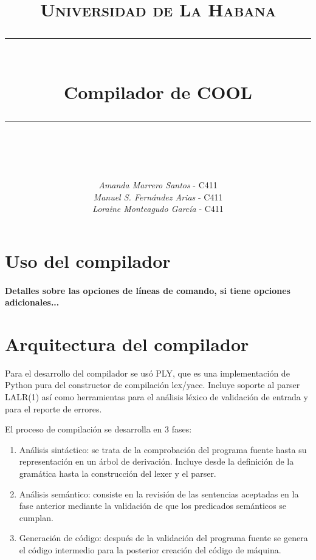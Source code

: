 \documentclass[11pt]{scrartcl} %
\title{	
	\normalfont\normalsize
	\textsc{Universidad de La Habana}\\ %
	\vspace{25pt} %
	\rule{\linewidth}{0.5pt}\\ %
	\vspace{20pt} %
	{\huge Compilador de COOL}\\ %
	\vspace{12pt} %
	\rule{\linewidth}{2pt}\\ %
	\vspace{12pt} %
}
\author{\textit{Amanda Marrero Santos} - C411 \\ \textit{Manuel S. Fernández Arias} - C411 \\ \textit{Loraine Monteagudo García} - C411 } %
\date{} %
\begin{document}
\maketitle %


\section{Uso del compilador}

\paragraph*{Detalles sobre las opciones de líneas de comando, si tiene opciones adicionales...}


\section{Arquitectura del compilador}

Para el desarrollo del compilador se usó PLY, que es una implementación de Python pura del constructor de compilación lex/yacc. Incluye soporte al parser LALR(1) así como herramientas para el análisis léxico de validación de entrada y para el reporte de errores.

El proceso de compilación se desarrolla en 3 fases: 

\begin{enumerate}
	\item Análisis sintáctico: se trata de la comprobación del programa fuente hasta su representación en un árbol de derivación. Incluye desde la definición de la gramática hasta la construcción del lexer y el parser.
	\item Análisis semántico: consiste en la revisión de las sentencias aceptadas en la fase anterior mediante la validación de que los predicados semánticos se cumplan. 
	\item Generación de código: después de la validación del programa fuente se genera el código intermedio para la posterior creación del código de máquina.
\end{enumerate}
\end{document}
